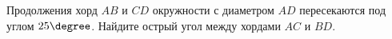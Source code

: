 \begin{ex}
	\begin{condition}
		Продолжения хорд \( AB  \) и \( CD  \) окружности с диаметром \( AD  \) пересекаются под углом \( 25\degree \). Найдите острый угол между хордами \( AC  \) и \( BD \).
	\end{condition}
	\answer{\( 25\degree \)}
\end{ex}